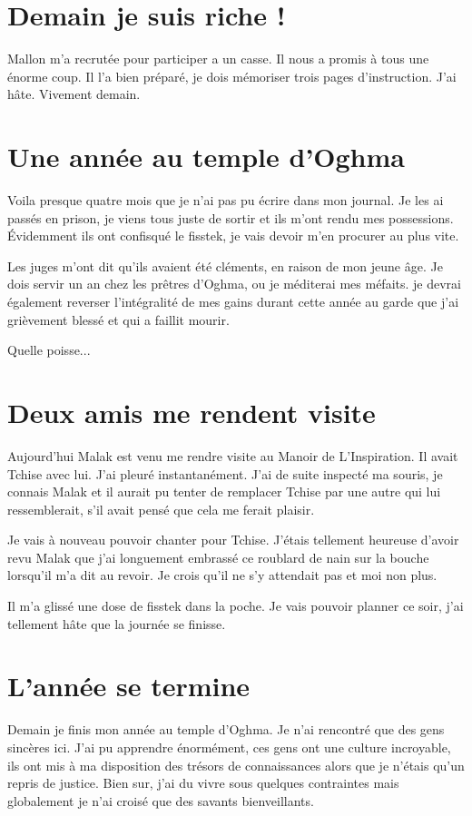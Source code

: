 \documentclass[10pt,a4paper,twoside,twocolumn,openany]{book}
\begin{document}
\section{Demain je suis riche !}

Mallon m'a recrutée pour participer a un casse. Il nous a promis à tous une énorme coup. Il l'a bien 
préparé, je dois mémoriser trois pages d'instruction. J'ai hâte. Vivement demain.

\section{Une année au temple d'Oghma}

Voila presque quatre mois que je n'ai pas pu écrire dans mon journal. Je les ai
passés en prison, je viens tous juste de sortir et ils m'ont rendu mes possessions.
Évidemment ils ont confisqué le fisstek, je vais devoir m'en procurer au plus vite.
 
Les juges m'ont dit qu'ils avaient été cléments, en raison de mon jeune âge. Je dois servir un an
chez les prêtres d'Oghma, ou je méditerai mes méfaits. je devrai également reverser l'intégralité 
de mes gains durant cette année au garde que j'ai grièvement blessé et qui a faillit mourir.

Quelle poisse...

\section{Deux amis me rendent visite}

Aujourd'hui Malak est venu me rendre visite au Manoir de L'Inspiration.
Il avait Tchise avec lui. J'ai pleuré instantanément.
J'ai de suite inspecté ma souris, je connais Malak et il aurait pu tenter de remplacer Tchise par une autre
qui lui ressemblerait, s'il avait pensé que cela me ferait plaisir. 

Je vais à nouveau pouvoir chanter pour Tchise. J'étais tellement heureuse d'avoir revu
Malak que j'ai longuement embrassé ce roublard de nain sur la bouche lorsqu'il m'a dit au revoir. Je crois qu'il ne s'y 
attendait pas et moi non plus.

Il m'a glissé une dose de fisstek dans la poche. Je vais pouvoir planner ce soir, j'ai tellement hâte que la journée 
se finisse.

\section{L'année se termine}
Demain je finis mon année au temple d'Oghma. Je n'ai rencontré que des gens sincères ici.
J'ai pu apprendre énormément, ces gens ont une culture incroyable, ils ont mis à ma 
disposition des trésors de connaissances alors que je n'étais qu'un repris de justice.
Bien sur, j'ai du vivre sous quelques contraintes mais globalement je n'ai croisé
que des savants bienveillants.
\end{document}
